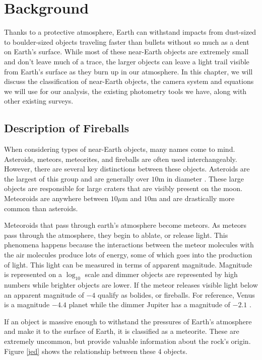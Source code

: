 \chapter{Background}

Thanks to a protective atmosphere, Earth can withstand impacts from dust-sized to boulder-sized objects traveling faster than bullets without so much as a dent on Earth's surface.
While most of these near-Earth objects are extremely small and don't leave much of a trace, the larger objects can leave a light trail visible from Earth's surface as they burn up in our atmosphere.
In this chapter, we will discuss the classification of near-Earth objects, the camera system and equations we will use for our analysis, the existing photometry tools we have, along with other existing surveys.


\section{Description of Fireballs}

When considering types of near-Earth objects, many names come to mind.  
Asteroids, meteors, meteorites, and fireballs are often used interchangeably. 
However, there are several key distinctions between these objects.  
Asteroids are the largest of this group and are generally over $10$m in diameter \cite{steel_meteoroid_1996}. 
These large objects are responsible for large craters that are visibly present on the moon.  
Meteoroids are anywhere between $10 \mu$m and $10$m and are drastically more common than asteroids.  

Meteoroids that pass through earth's atmosphere become meteors.
As meteors pass through the atmosphere, they begin to ablate, or release light.  
This phenomena happens because the interactions between the meteor molecules with the air molecules produce lots of energy, some of which goes into the production of light.
This light can be measured in terms of apparent magnitude.
Magnitude is represented on a $\log_10$ scale and dimmer objects are represented by high numbers while brighter objects are lower.  
If the meteor releases visible light below an apparent magnitude of $-4$ qualify as bolides, or fireballs.
For reference, Venus is a magnitude $-4.4$ planet while the dimmer Jupiter has a magnitude of $-2.1$ \cite{rao_venus_nodate}.


If an object is massive enough to withstand the pressures of Earth's atmosphere and make it to the surface of Earth, it is classified as a meteorite. 
These are extremely uncommon, but provide valuable information about the rock's origin.
Figure \ref{jed} shows the relationship between these 4 objects.

